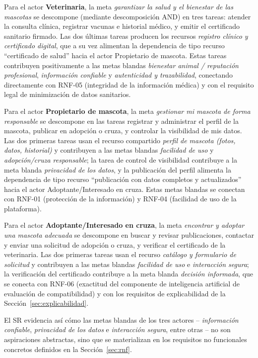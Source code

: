 \documentclass[journal,onecolumn]{IEEEtran}
\begin{document}
	Para el actor \textbf{Veterinaria}, la meta \emph{garantizar la salud y el
		bienestar de las mascotas} se descompone (mediante descomposición AND) en tres
	tareas: atender la consulta clínica, registrar vacunas e historial médico, y
	emitir el certificado sanitario firmado. Las dos últimas tareas producen los
	recursos \emph{registro clínico y certificado digital}, que a su vez alimentan
	la dependencia de tipo recurso \enquote{certificado de salud} hacia el actor
	Propietario de mascota. Estas tareas contribuyen positivamente a las metas
	blandas \emph{bienestar animal / reputación profesional},
	\emph{información confiable} y \emph{autenticidad y trazabilidad}, conectando
	directamente con RNF-05 (integridad de la información médica) y con el
	requisito legal de minimización de datos sanitarios.
	
	Para el actor \textbf{Propietario de mascota}, la meta \emph{gestionar mi
		mascota de forma responsable} se descompone en las tareas registrar y
	administrar el perfil de la mascota, publicar en adopción o cruza, y
	controlar la visibilidad de mis datos. Las dos primeras tareas usan el
	recurso compartido \emph{perfil de mascota (fotos, datos, historial)} y
	contribuyen a las metas blandas \emph{facilidad de uso} y
	\emph{adopción/cruza responsable}; la tarea de control de visibilidad
	contribuye a la meta blanda \emph{privacidad de los datos}, y la publicación
	del perfil alimenta la dependencia de tipo recurso \enquote{publicación con
		datos completos y actualizados} hacia el actor Adoptante/Interesado en cruza.
	Estas metas blandas se conectan con RNF-01 (protección de la información) y
	RNF-04 (facilidad de uso de la plataforma).
	
	Para el actor \textbf{Adoptante/Interesado en cruza}, la meta \emph{encontrar
		y adoptar una mascota adecuada} se descompone en buscar y revisar
	publicaciones, contactar y enviar una solicitud de adopción o cruza, y
	verificar el certificado de la veterinaria. Las dos primeras tareas usan el
	recurso \emph{catálogo y formulario de solicitud} y contribuyen a las metas
	blandas \emph{facilidad de uso} e \emph{interacción segura}; la verificación
	del certificado contribuye a la meta blanda \emph{decisión informada}, que se
	conecta con RNF-06 (exactitud del componente de inteligencia artificial de
	evaluación de compatibilidad) y con los requisitos de explicabilidad de la
	Sección~\ref{sec:explicabilidad}.
	
	El SR evidencia así cómo las metas blandas de los tres actores --
	\emph{información confiable}, \emph{privacidad de los datos} e
	\emph{interacción segura}, entre otras -- no son aspiraciones abstractas, sino
	que se materializan en los requisitos no funcionales concretos definidos en la
	Sección~\ref{sec:rnf}.
	
\end{document}
